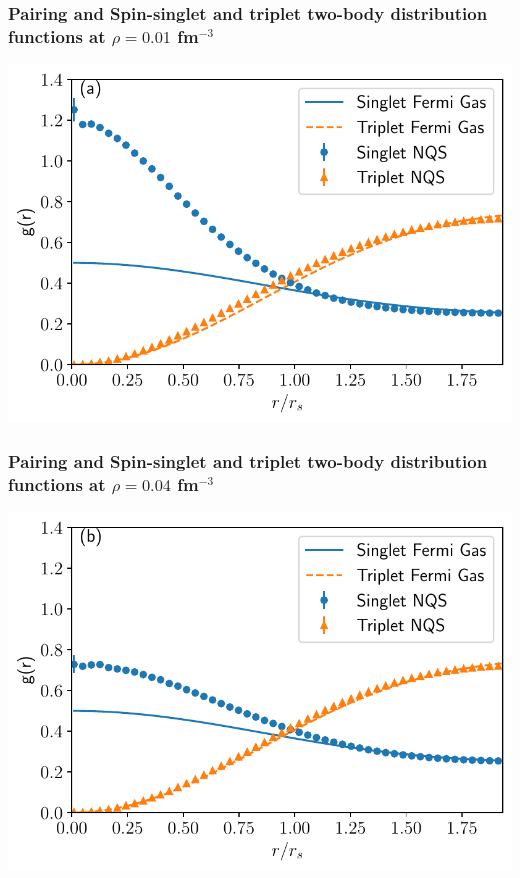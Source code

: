 \documentclass{beamer}
\begin{document}
\begin{frame}
\frametitle{Pairing and Spin-singlet and triplet two-body distribution functions at $\rho=0.01$ fm$^{-3}$}

\begin{block}{}

\vspace{6mm}

\centerline{\includegraphics[width=0.9\linewidth]{figures/01_tbd.pdf}}

\vspace{6mm}

\end{block}
\end{frame}

\begin{frame}
\frametitle{Pairing and Spin-singlet and triplet two-body distribution functions at $\rho=0.04$ fm$^{-3}$}

\begin{block}{}

\vspace{6mm}

\centerline{\includegraphics[width=0.9\linewidth]{figures/04_tbd.pdf}}

\vspace{6mm}

\end{block}
\end{frame}
\end{document}

